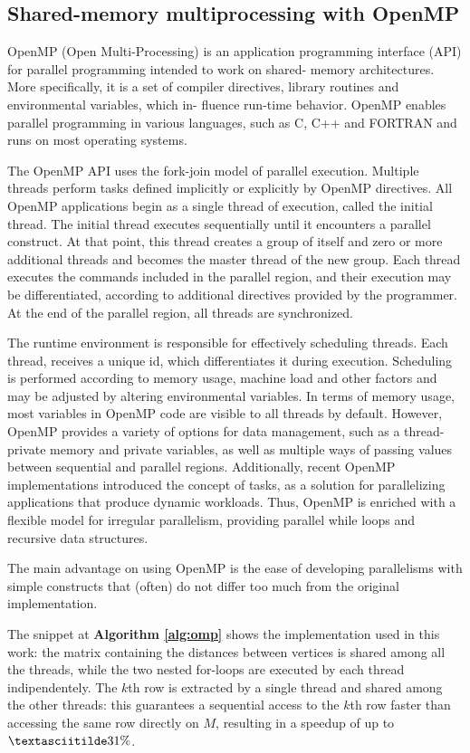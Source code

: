 \subsection{Shared-memory multiprocessing with OpenMP}
OpenMP (Open Multi-Processing) is an application programming
interface (API) for parallel programming intended to work on shared-
memory architectures. More specifically, it is a set of compiler
directives, library routines and environmental variables, which in-
fluence run-time behavior. OpenMP enables parallel programming in
various languages, such as C, C++ and FORTRAN and runs on most
operating systems. \par
The OpenMP API uses the fork-join model of parallel execution.
Multiple threads perform tasks defined implicitly or explicitly by
OpenMP directives. All OpenMP applications begin as a single thread
of execution, called the initial thread. The initial thread executes
sequentially until it encounters a parallel construct. At that point,
this thread creates a group of itself and zero or more additional
threads and becomes the master thread of the new group. Each thread
executes the commands included in the parallel region, and their
execution may be differentiated, according to additional directives
provided by the programmer. At the end of the parallel region, all
threads are synchronized. \par
The runtime environment is responsible for effectively scheduling
threads. Each thread, receives a unique id, which differentiates it
during execution. Scheduling is performed according to memory
usage, machine load and other factors and may be adjusted by altering
environmental variables. In terms of memory usage, most variables in
OpenMP code are visible to all threads by default. However, OpenMP
provides a variety of options for data management, such as a thread-
private memory and private variables, as well as multiple ways of
passing values between sequential and parallel regions. Additionally,
recent OpenMP implementations introduced the concept of tasks,
as a solution for parallelizing applications that produce dynamic
workloads. Thus, OpenMP is enriched with a flexible model for
irregular parallelism, providing parallel while loops and recursive
data structures. \par
The main advantage on using OpenMP is the ease of developing parallelisms
with simple constructs that (often) do not differ too much from the original implementation.

The snippet at \textbf{Algorithm \ref*{alg:omp}} shows the implementation used in this work: the matrix containing the
distances between vertices is shared among all the threads, while the two nested for-loops are executed
by each thread indipendentely. The $k$th row is extracted by a single thread and shared among the other threads: this
guarantees a sequential access to the $k$th row faster than accessing the same row directly on $M$, resulting in a speedup of up to $\textasciitilde31\%$.

